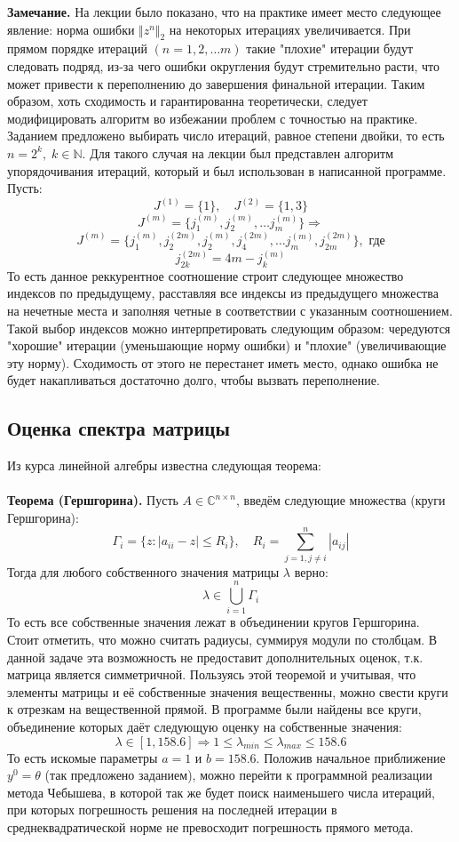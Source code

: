 \documentclass[a4paper,12pt,titlepage,final]{article}
\begin{document}
\textbf{Замечание.} На лекции было показано, что на практике имеет место следующее явление: норма ошибки $\Vert z^n \Vert_2$ на некоторых итерациях увеличивается. При прямом порядке итераций $(n = 1, 2, \ldots m)$ такие "плохие" итерации будут следовать подряд, из-за чего ошибки округления будут стремительно расти, что может привести к переполнению до завершения финальной итерации. Таким образом, хоть сходимость и гарантированна теоретически, следует модифицировать алгоритм во избежании проблем с точностью на практике. Заданием предложено выбирать число итераций, равное степени двойки, то есть $n = 2^k, \; k \in \mathbb{N}$. Для такого случая на лекции был представлен алгоритм упорядочивания итераций, который и был использован в написанной программе. Пусть:
$$J^{(1)} = \{1\}, \quad J^{(2)} = \{1, 3\} $$
$$J^{(m)} = \{ j_1^{(m)},  j_2^{(m)}, \ldots j_m^{(m)}\} \Rightarrow$$
$$J^{(m)} = \{ j_1^{(m)}, j_2^{(2m)} , j_2^{(m)}, j_4^{(2m)} , \ldots j_m^{(m)}, j_{2m}^{(2m)}\}, \text{ где}$$
$$j_{2k}^{(2m)} = 4m - j_k^{(m)}$$
То есть данное реккурентное соотношение строит следующее множество индексов по предыдущему, расставляя все индексы из предыдущего множества на нечетные места и заполняя четные в соответствии с указанным соотношением. Такой выбор индексов можно интерпретировать следующим образом: чередуются "хорошие" итерации (уменьшающие норму ошибки) и "плохие" (увеличивающие эту норму). Сходимость от этого не перестанет иметь место, однако ошибка не будет накапливаться достаточно долго, чтобы вызвать переполнение.
\subsection{Оценка спектра матрицы}
Из курса линейной алгебры известна следующая теорема: \\ \\
\textbf{Теорема (Гершгорина).} Пусть $A \in \mathbb{C}^{n\times n}$, введём следующие множества (круги Гершгорина):
$$\Gamma_i = \{z: |a_{ii} - z| \leq R_i\} ,\quad R_i = \sum^n_{j=1, j\neq i} |a_{ij}|$$
Тогда для любого собственного значения матрицы $\lambda$ верно:
$$\lambda \in \bigcup_{i=1}^n \Gamma_i$$ То есть все собственные значения лежат в объединении кругов Гершгорина. Стоит отметить, что можно считать радиусы, суммируя модули по столбцам. В данной задаче эта возможность не предоставит дополнительных оценок, т.к. матрица является симметричной. Пользуясь этой теоремой и учитывая, что элементы матрицы и её собственные значения вещественны, можно свести круги к отрезкам на вещественной прямой. В программе были найдены все круги, объединение которых даёт следующую оценку на собственные значения: $$\lambda \in [1, 158.6] \Rightarrow 1 \leq \lambda_{min} \leq \lambda_{max} \leq 158.6$$
То есть искомые параметры $a = 1$ и $b = 158.6$. Положив начальное приближение $y^0 = \theta$ (так предложено заданием), можно перейти к программной реализации метода Чебышева, в которой так же будет поиск наименьшего числа итераций, при которых погрешность решения на последней итерации в среднеквадратической норме не превосходит погрешность прямого метода.
\end{document}
